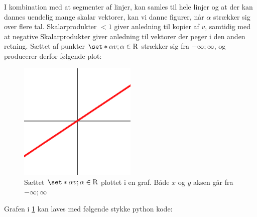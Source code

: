 I kombination med at segmenter af linjer, kan samles til hele linjer og at der kan dannes uendelig mange skalar vektorer, kan vi danne figurer, når $\alpha$ strækker sig over flere tal.
Skalarprodukter $<1$ giver anledning til kopier af $v$, samtidig med at negative Skalarprodukter giver anledning til vektorer der peger i den anden retning.
Sættet af punkter $\set*{\alpha v;\alpha\in \mathrm{R}}$ strækker sig fra $-\infty;\infty$, og producerer derfor følgende plot:
\begin{figure}[h]
	\centering
	\includegraphics[width=0.5\textwidth]{img/thrh_origin.png}
	\caption{Sættet $\set*{\alpha v;\alpha\in \mathrm{R}}$ plottet i en graf.
	Både $x$ og $y$ aksen går fra $-\infty;\infty$}
	\label{fig:plot_through}
\end{figure}

Grafen i \cref{fig:plot_through} kan laves med følgende stykke python kode:

